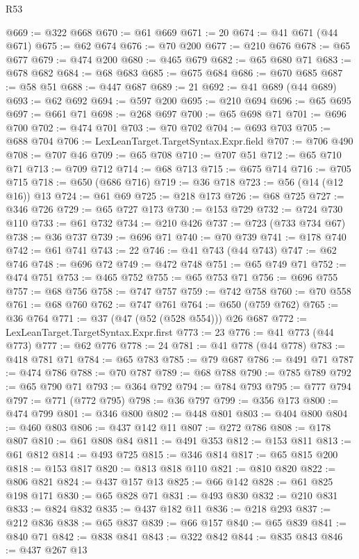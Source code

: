 \begin{lexlean}{R53}
\begin{coremodule}
@669 := @322 @668
@670 := @61 @669
@671 := 20
@674 := @41 @671 (@44 @671)
@675 := @62 @674
@676 := @70 @200
@677 := @210 @676
@678 := @65 @677
@679 := @474 @200
@680 := @465 @679
@682 := @65 @680 @71
@683 := @678 @682
@684 := @68 @683
@685 := @675 @684
@686 := @670 @685
@687 := @58 @51
@688 := @447 @687
@689 := 21
@692 := @41 @689 (@44 @689)
@693 := @62 @692
@694 := @597 @200
@695 := @210 @694
@696 := @65 @695
@697 := @661 @71
@698 := @268 @697
@700 := @65 @698 @71
@701 := @696 @700
@702 := @474 @701
@703 := @70 @702
@704 := @693 @703
@705 := @688 @704
@706 := LexLeanTarget.TargetSyntax.Expr.field
@707 := @706 @490
@708 := @707 @46
@709 := @65 @708
@710 := @707 @51
@712 := @65 @710 @71
@713 := @709 @712
@714 := @68 @713
@715 := @675 @714
@716 := @705 @715
@718 := @650 (@686 @716)
@719 := @36 @718
@723 := @56 (@14 (@12 @16)) @13
@724 := @61 @69
@725 := @218 @173
@726 := @68 @725
@727 := @346 @726
@729 := @65 @727 @173
@730 := @153 @729
@732 := @724 @730 @110
@733 := @61 @732
@734 := @210 @426
@737 := @723 (@733 @734 @67)
@738 := @36 @737
@739 := @696 @71
@740 := @70 @739
@741 := @178 @740
@742 := @61 @741
@743 := 22
@746 := @41 @743 (@44 @743)
@747 := @62 @746
@748 := @696 @72
@749 := @472 @748
@751 := @65 @749 @71
@752 := @474 @751
@753 := @465 @752
@755 := @65 @753 @71
@756 := @696 @755
@757 := @68 @756
@758 := @747 @757
@759 := @742 @758
@760 := @70 @558
@761 := @68 @760
@762 := @747 @761
@764 := @650 (@759 @762)
@765 := @36 @764
@771 := @37 (@47 (@52 (@528 @554))) @26 @687
@772 := LexLeanTarget.TargetSyntax.Expr.first
@773 := 23
@776 := @41 @773 (@44 @773)
@777 := @62 @776
@778 := 24
@781 := @41 @778 (@44 @778)
@783 := @418 @781 @71
@784 := @65 @783
@785 := @79 @687
@786 := @491 @71
@787 := @474 @786
@788 := @70 @787
@789 := @68 @788
@790 := @785 @789
@792 := @65 @790 @71
@793 := @364 @792
@794 := @784 @793
@795 := @777 @794
@797 := @771 (@772 @795)
@798 := @36 @797
@799 := @356 @173
@800 := @474 @799
@801 := @346 @800
@802 := @448 @801
@803 := @404 @800
@804 := @460 @803
@806 := @437 @142 @11
@807 := @272 @786
@808 := @178 @807
@810 := @61 @808 @84
@811 := @491 @353
@812 := @153 @811
@813 := @61 @812
@814 := @493 @725
@815 := @346 @814
@817 := @65 @815 @200
@818 := @153 @817
@820 := @813 @818 @110
@821 := @810 @820
@822 := @806 @821
@824 := @437 @157 @13
@825 := @66 @142
@828 := @61 @825 @198 @171
@830 := @65 @828 @71
@831 := @493 @830
@832 := @210 @831
@833 := @824 @832
@835 := @437 @182 @11
@836 := @218 @293
@837 := @212 @836
@838 := @65 @837
@839 := @66 @157
@840 := @65 @839
@841 := @840 @71
@842 := @838 @841
@843 := @322 @842
@844 := @835 @843
@846 := @437 @267 @13

\end{coremodule}
\end{lexlean}
